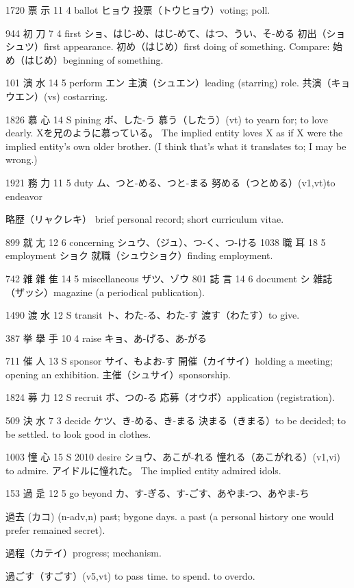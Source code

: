 1720	票		示	11	4		ballot	ヒョウ
投票（トウヒョウ）voting; poll.

944	初		刀	7	4		first	ショ、はじ-め、はじ-めて、はつ、うい、そ-める
初出（ショシュツ）first appearance.
初め（はじめ）first doing of something.
Compare: 始め（はじめ）beginning of something.

101	演		水	14	5		perform	エン
主演（シュエン）leading (starring) role.
共演（キョウエン）(vs) costarring.

1826	慕		心	14	S		pining	ボ、した-う
慕う（したう）(vt) to yearn for; to love dearly.
Xを兄のように慕っている。
The implied entity loves X as if
X were the implied entity's own older brother.
(I think that's what it translates to; I may be wrong.)

1921	務		力	11	5		duty	ム、つと-める、つと-まる
努める（つとめる）(v1,vt)to endeavor

略歴（リャクレキ）
brief personal record;
short curriculum vitae.

899	就		尢	12	6		concerning	シュウ、（ジュ）、つ-く、つ-ける
1038	職		耳	18	5		employment	ショク
就職（シュウショク）finding employment.

742	雑	雜	隹	14	5		miscellaneous	ザツ、ゾウ
801	誌		言	14	6		document	シ
雑誌（ザッシ）magazine (a periodical publication).

1490	渡		水	12	S		transit	ト、わた-る、わた-す
渡す（わたす）to give.

387	挙	擧	手	10	4		raise	キョ、あ-げる、あ-がる

711	催		人	13	S		sponsor	サイ、もよお-す
開催（カイサイ）holding a meeting; opening an exhibition.
主催（シュサイ）sponsorship.

1824	募		力	12	S		recruit	ボ、つの-る
応募（オウボ）application (registration).

509	決		水	7	3		decide	ケツ、き-める、き-まる
決まる（きまる）to be decided; to be settled. to look good in clothes.

1003	憧		心	15	S	2010	desire	ショウ、あこが-れる
憧れる（あこがれる）(v1,vi) to admire.
アイドルに憧れた。
The implied entity admired idols.

153	過		辵	12	5		go beyond	カ、す-ぎる、す-ごす、あやま-つ、あやま-ち

過去 (カコ) (n-adv,n)
past; bygone days.
a past (a personal history one would prefer remained secret).

過程（カテイ）progress; mechanism.

過ごす（すごす）(v5,vt) to pass time. to spend. to overdo.

